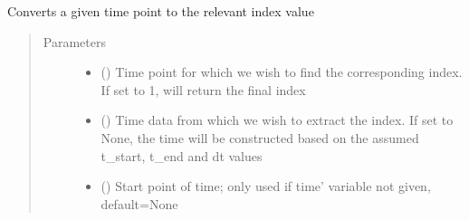 \documentclass[letterpaper,10pt,english]{sphinxmanual}
\begin{document}
\begin{fulllineitems}
\label{\detokenize{_autosummary/tools.python.convert_time_to_index:tools.python.convert_time_to_index}}
\sphinxAtStartPar
Converts a given time point to the relevant index value
\begin{quote}\begin{description}
\item[{Parameters}] \leavevmode\begin{itemize}
\item {} 
\sphinxAtStartPar
{} () \textendash{} Time point for which we wish to find the corresponding index. If set to \sphinxhyphen{}1, will return the final index

\item {} 
\sphinxAtStartPar
{} (\sphinxstyleliteralemphasis{\sphinxupquote{, }}) \textendash{} Time data from which we wish to extract the index. If set to None, the time will be constructed based on the
assumed t\_start, t\_end and dt values

\item {} 
\sphinxAtStartPar
{} (\sphinxstyleliteralemphasis{\sphinxupquote{, }}) \textendash{} Start point of time; only used if {\color{red}\bfseries{}\textasciigrave{}}time’ variable not given, default=None


\end{itemize}
\end{description}
\end{quote}
\end{fulllineitems}
\end{document}
